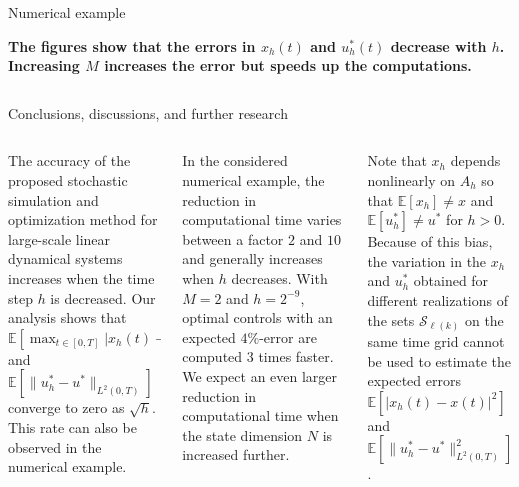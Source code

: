 \documentclass[mathserif]{beamer}
\begin{document}
\begin{frame}
\begin{columns}[T]
\begin{column}{.45\textwidth}
\begin{block}{Numerical example}
\begin{center}
\begin{flushright}
\end{flushright}
\vspace{-0.7cm}
\end{center}

\vspace{0.2cm}
\begin{center}
\textbf{The figures show that the errors in $x_h(t)$ and $u^*_h(t)$ decrease with $h$. \\
Increasing $M$ increases the error but speeds up the computations. }
\end{center}
      \end{block}
      \end{column}
\end{columns}

\vspace{-0.5cm}
    \begin{columns}[t]
  \begin{column}{0.94\textwidth}
\begin{block}{Conclusions, discussions, and further research}
\vspace{0.5cm}
\begin{columns}
\begin{column}{0.24\textwidth}
The accuracy of the proposed stochastic simulation and optimization method for large-scale linear dynamical systems increases when the time step $h$ is decreased. Our analysis shows that $\mathbb{E}[\max_{t \in [0,T]} | x_h(t) - x(t) |]$ and $\mathbb{E}[\| u_h^* - u^* \|_{L^2(0,T)}]$ converge to zero as $\sqrt{h}$. This rate can also be observed in the numerical example. 
\end{column}

\begin{column}{0.24\textwidth}
In the considered numerical example, the reduction in computational time varies between a factor $2$ and $10$ and generally increases when $h$ decreases. With $M =2$ and $h=2^{-9}$, optimal controls with an expected $4\%$-error are computed $3$ times faster. We expect an even larger reduction in computational time when the state dimension $N$ is increased further. 
\vspace{0.4cm}
\end{column}

\begin{column}{0.24\textwidth}
Note that $x_h$ depends nonlinearly on $A_h$ so that $\mathbb{E}[x_h] \neq x$ and $\mathbb{E}[u^*_h] \neq u^*$ for $h > 0$. Because of this bias, the variation in the $x_h$ and $u^*_h$ obtained for different realizations of the sets $\mathcal{S}_{\ell(k)}$ on the same time grid cannot be used to estimate the expected errors $\mathbb{E}[|x_h(t) - x(t)|^2]$ and $\mathbb{E}[\|u^*_h - u^*\|_{L^2(0,T)}^2]$. 
\vspace{0.9cm} 
\end{column}
    

\end{columns}
\end{block}
\end{column}
\end{columns}
\end{frame}
\end{document}
